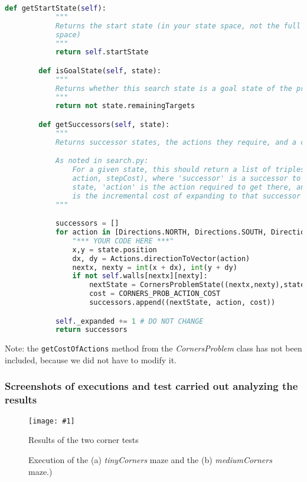 \documentclass{article}
\newcommand{\myFigure}[4]{%
    \begin{figure}[H]
        \texttt{[image: \#1]}
        \centering
        \caption{#2}
        \label{#3}
    \end{figure}
}
\begin{document}
\begin{lstlisting}[language=python,captionpos=t,caption={The state and problem definition of the corners problem (\emph{searchAgents.py})}]
        def getStartState(self):
            """
            Returns the start state (in your state space, not the full Pacman state
            space)
            """
            return self.startState

        def isGoalState(self, state):
            """
            Returns whether this search state is a goal state of the problem.
            """
            return not state.remainingTargets

        def getSuccessors(self, state):
            """
            Returns successor states, the actions they require, and a cost of 1.

            As noted in search.py:
                For a given state, this should return a list of triples, (successor,
                action, stepCost), where 'successor' is a successor to the current
                state, 'action' is the action required to get there, and 'stepCost'
                is the incremental cost of expanding to that successor
            """

            successors = []
            for action in [Directions.NORTH, Directions.SOUTH, Directions.EAST, Directions.WEST]:
                "*** YOUR CODE HERE ***"
                x,y = state.position
                dx, dy = Actions.directionToVector(action)
                nextx, nexty = int(x + dx), int(y + dy)
                if not self.walls[nextx][nexty]:
                    nextState = CornersProblemState((nextx,nexty),state.remainingTargets)                
                    cost = CORNERS_PROB_ACTION_COST
                    successors.append((nextState, action, cost))

            self._expanded += 1 # DO NOT CHANGE
            return successors
\end{lstlisting}

Note: the \texttt{getCostOfActions} method from the \emph{CornersProblem} class has not been included, because we did not have to modify it. 

\subsubsection{Screenshots of executions and test carried out analyzing the results}

\myFigure{./img/ex5/victoryCorners}{Results of the two corner tests}{victoryCorners}{1}

\begin{figure}[h!]
    \centering
    \caption{Execution of the (a) \emph{tinyCorners} maze and the (b) \emph{mediumCorners} maze.)}
    \centering
    \label{corners_execution}
\end{figure}
\end{document}
